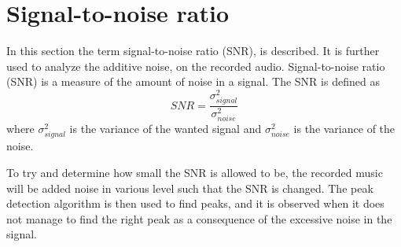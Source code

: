 \section{Signal-to-noise ratio}
In this section the term signal-to-noise ratio (SNR), is described.
It is further used to analyze the additive noise, on the recorded audio.
Signal-to-noise ratio (SNR) is a measure of the amount of noise in a signal. 
The SNR is defined as
\begin{equation}\label{eq:SNR}
SNR=\frac{\sigma_{signal}^2}{\sigma_{noise}^2}
\end{equation}
where $\sigma_{signal}^2$ is the variance of the wanted signal and $\sigma_{noise}^2$ is the variance of the noise.

To try and determine how small the SNR is allowed to be, the recorded music will be added noise in various level such that the SNR is changed. 
The peak detection algorithm is then used to find peaks, and it is observed when it does not manage to find the right peak as a consequence of the excessive noise in the signal.
